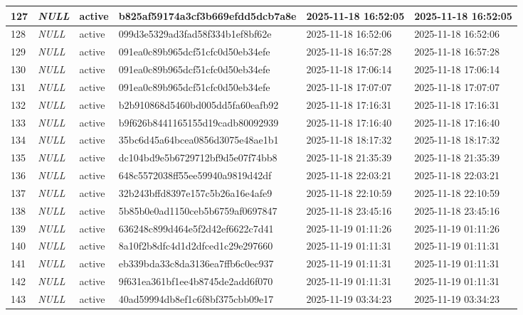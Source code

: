 \begin{longtable}{|l|l|l|l|l|l|}
127 & \textit{NULL} & active & b825af59174a3cf3b669efdd5dcb7a8e & 2025-11-18 16:52:05 & 2025-11-18 16:52:05 \\ \hline 
128 & \textit{NULL} & active & 099d3e5329ad3fad58f334b1ef8bf62e & 2025-11-18 16:52:06 & 2025-11-18 16:52:06 \\ \hline 
129 & \textit{NULL} & active & 091ea0c89b965dcf51cfc0d50eb34efe & 2025-11-18 16:57:28 & 2025-11-18 16:57:28 \\ \hline 
130 & \textit{NULL} & active & 091ea0c89b965dcf51cfc0d50eb34efe & 2025-11-18 17:06:14 & 2025-11-18 17:06:14 \\ \hline 
131 & \textit{NULL} & active & 091ea0c89b965dcf51cfc0d50eb34efe & 2025-11-18 17:07:07 & 2025-11-18 17:07:07 \\ \hline 
132 & \textit{NULL} & active & b2b910868d5460bd005dd5fa60eafb92 & 2025-11-18 17:16:31 & 2025-11-18 17:16:31 \\ \hline 
133 & \textit{NULL} & active & b9f626b8441165155d19cadb80092939 & 2025-11-18 17:16:40 & 2025-11-18 17:16:40 \\ \hline 
134 & \textit{NULL} & active & 35bc6d45a64bcea0856d3075e48ae1b1 & 2025-11-18 18:17:32 & 2025-11-18 18:17:32 \\ \hline 
135 & \textit{NULL} & active & dc104bd9e5b6729712bf9d5e07f74bb8 & 2025-11-18 21:35:39 & 2025-11-18 21:35:39 \\ \hline 
136 & \textit{NULL} & active & 648c5572038ff55ee59940a9819d42df & 2025-11-18 22:03:21 & 2025-11-18 22:03:21 \\ \hline 
137 & \textit{NULL} & active & 32b243bffd8397e157c5b26a16e4afe9 & 2025-11-18 22:10:59 & 2025-11-18 22:10:59 \\ \hline 
138 & \textit{NULL} & active & 5b85b0e0ad1150ceb5b6759af0697847 & 2025-11-18 23:45:16 & 2025-11-18 23:45:16 \\ \hline 
139 & \textit{NULL} & active & 636248c899d464e5f2d42ef6622c7d41 & 2025-11-19 01:11:26 & 2025-11-19 01:11:26 \\ \hline 
140 & \textit{NULL} & active & 8a10f2b8dfc4d1d2dfced1c29e297660 & 2025-11-19 01:11:31 & 2025-11-19 01:11:31 \\ \hline 
141 & \textit{NULL} & active & eb339bda33c8da3136ea7ffb6c0ec937 & 2025-11-19 01:11:31 & 2025-11-19 01:11:31 \\ \hline 
142 & \textit{NULL} & active & 9f631ea361bf1ee4b8745de2add6f070 & 2025-11-19 01:11:31 & 2025-11-19 01:11:31 \\ \hline 
143 & \textit{NULL} & active & 40ad59994db8ef1c6f8bf375cbb09e17 & 2025-11-19 03:34:23 & 2025-11-19 03:34:23 \\ \hline 

\end{longtable}
